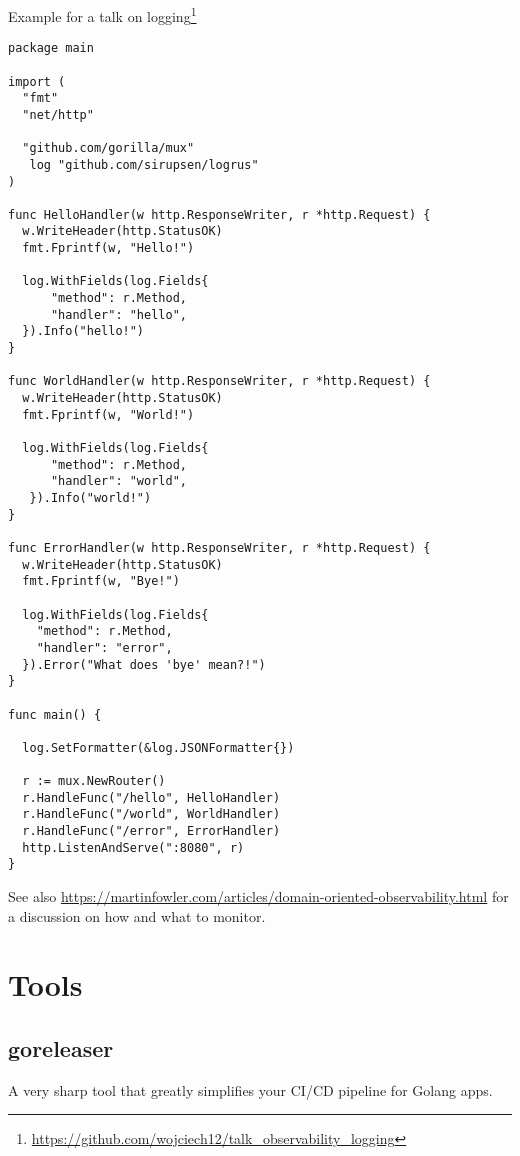 \documentclass[11pt, letterpaper]{article}
\begin{document}
Example for a talk on logging\footnote{\href{https://github.com/wojciech12/talk_observability_logging}{https://github.com/wojciech12/talk\_observability\_logging}}

\begin{verbatim}
package main

import (
  "fmt"
  "net/http"

  "github.com/gorilla/mux"
   log "github.com/sirupsen/logrus"
)

func HelloHandler(w http.ResponseWriter, r *http.Request) {
  w.WriteHeader(http.StatusOK)
  fmt.Fprintf(w, "Hello!")

  log.WithFields(log.Fields{
      "method": r.Method,
      "handler": "hello",
  }).Info("hello!")
}

func WorldHandler(w http.ResponseWriter, r *http.Request) {
  w.WriteHeader(http.StatusOK)
  fmt.Fprintf(w, "World!")

  log.WithFields(log.Fields{
      "method": r.Method,
      "handler": "world",
   }).Info("world!")
}

func ErrorHandler(w http.ResponseWriter, r *http.Request) {
  w.WriteHeader(http.StatusOK)
  fmt.Fprintf(w, "Bye!")

  log.WithFields(log.Fields{
    "method": r.Method,
    "handler": "error",
  }).Error("What does 'bye' mean?!")
}

func main() {

  log.SetFormatter(&log.JSONFormatter{})

  r := mux.NewRouter()
  r.HandleFunc("/hello", HelloHandler)
  r.HandleFunc("/world", WorldHandler)
  r.HandleFunc("/error", ErrorHandler)
  http.ListenAndServe(":8080", r)
}
\end{verbatim}

See also \href{https://martinfowler.com/articles/domain-oriented-observability.html}{https://martinfowler.com/articles/domain-oriented-observability.html} for a discussion on how and what to monitor.

\pagebreak
\section{Tools}

\subsection{goreleaser}

A very sharp tool that greatly simplifies your CI/CD pipeline for Golang apps.
\end{document}
